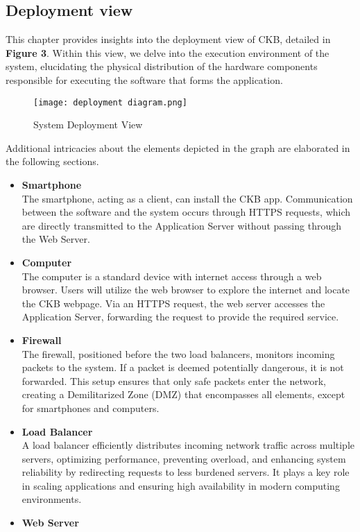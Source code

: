 \documentclass{article}
\begin{document}
\subsection{Deployment view}
This chapter provides insights into the deployment view of CKB, detailed in \textbf{Figure 3}. Within this view, we delve into the execution environment of the system, elucidating the physical distribution of the hardware components responsible for executing the software that forms the application.
\begin{figure}[H]
    \centering
    \texttt{[image: deployment diagram.png]}
    \caption{System Deployment View}
\end{figure}
\noindent
Additional intricacies about the elements depicted in the graph are elaborated in the following sections.
\begin{itemize}
    \item \textbf{Smartphone} \\
    The smartphone, acting as a client, can install the CKB app. Communication between the software and the system occurs through HTTPS requests, which are directly transmitted to the Application Server without passing through the Web Server.
    \item \textbf{Computer} \\
    The computer is a standard device with internet access through a web browser. Users will utilize the web browser to explore the internet and locate the CKB webpage. Via an HTTPS request, the web server accesses the Application Server, forwarding the request to provide the required service.
    \item \textbf{Firewall} \\
    The firewall, positioned before the two load balancers, monitors incoming packets to the system. If a packet is deemed potentially dangerous, it is not forwarded. This setup ensures that only safe packets enter the network, creating a Demilitarized Zone (DMZ) that encompasses all elements, except for smartphones and computers.
    \item \textbf{Load Balancer} \\
    A load balancer efficiently distributes incoming network traffic across multiple servers, optimizing performance, preventing overload, and enhancing system reliability by redirecting requests to less burdened servers. It plays a key role in scaling applications and ensuring high availability in modern computing environments.
    \item \textbf{Web Server} \\

\end{itemize}
\end{document}
